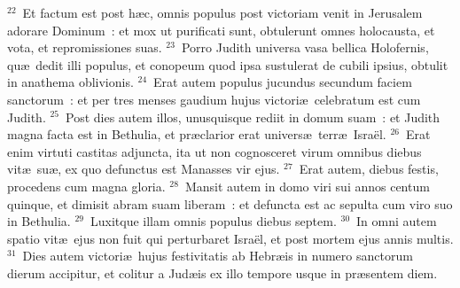 ${}^{22}$~Et factum est post h\ae c, omnis populus post victoriam venit in Jerusalem adorare Dominum~: et mox ut purificati sunt, obtulerunt omnes holocausta, et vota, et repromissiones suas.
${}^{23}$~Porro Judith universa vasa bellica Holofernis, qu\ae\ dedit illi populus, et conopeum quod ipsa sustulerat de cubili ipsius, obtulit in anathema oblivionis.
${}^{24}$~Erat autem populus jucundus secundum faciem sanctorum~: et per tres menses gaudium hujus victori\ae\ celebratum est cum Judith.
${}^{25}$~Post dies autem illos, unusquisque rediit in domum suam~: et Judith magna facta est in Bethulia, et pr\ae clarior erat univers\ae\ terr\ae\ Isra\"el.
${}^{26}$~Erat enim virtuti castitas adjuncta, ita ut non cognosceret virum omnibus diebus vit\ae\ su\ae , ex quo defunctus est Manasses vir ejus.
${}^{27}$~Erat autem, diebus festis, procedens cum magna gloria.
${}^{28}$~Mansit autem in domo viri sui annos centum quinque, et dimisit abram suam liberam~: et defuncta est ac sepulta cum viro suo in Bethulia.
${}^{29}$~Luxitque illam omnis populus diebus septem.
${}^{30}$~In omni autem spatio vit\ae\ ejus non fuit qui perturbaret Isra\"el, et post mortem ejus annis multis.
${}^{31}$~Dies autem victori\ae\ hujus festivitatis ab Hebr\ae is in numero sanctorum dierum accipitur, et colitur a Jud\ae is ex illo tempore usque in pr\ae sentem diem.
